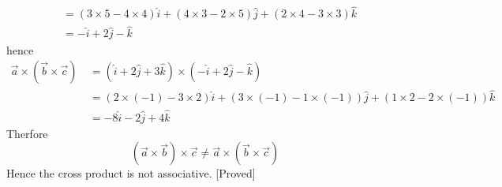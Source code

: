 \documentclass{article}
\begin{document}
\begin{enumerate}
\begin{align*}
			&=(3\times5-4\times4)\hat{i}+(4\times3-2\times 5)\hat{j}+(2\times4-3\times3)\hat{k}\\
			&=-\hat{i}+2\hat{j}-\hat{k}
		\end{align*}hence
	\begin{align*}
		\vec{a}\times(\vec{b}\times\vec{c})\ &=(\hat{i}+2\hat{j}+3\hat{k})\times(-\hat{i}+2\hat{j}-\hat{k})\\
		&=(2\times(-1)-3\times2)\hat{i}+(3\times(-1)-1\times(-1))\hat{j}+(1\times2-2\times(-1))\hat{k}\\
		&=-8\hat{i}-2\hat{j}+4\hat{k}
	\end{align*}Therfore$$ (\vec{a}\times\vec{b})\times\vec{c}\neq \vec{a}\times(\vec{b}\times\vec{c})$$Hence the cross product is not associative. [Proved]

	\end{enumerate}
\end{document}
